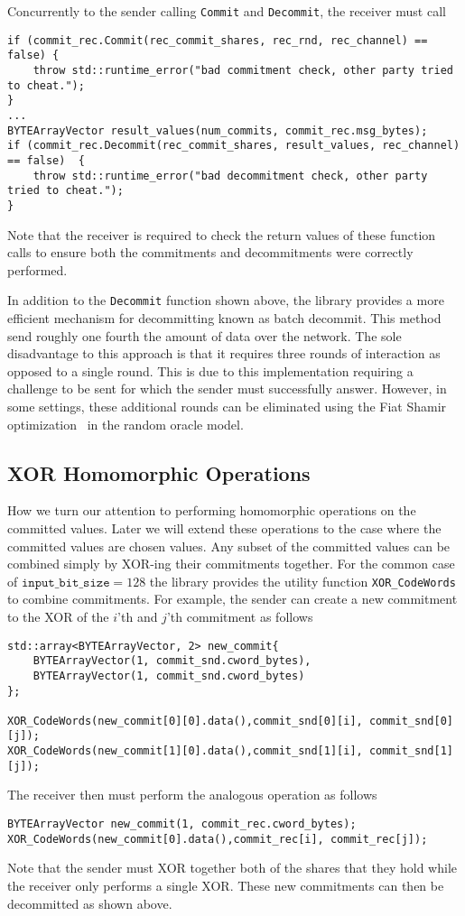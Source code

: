 Concurrently to the sender calling \texttt{Commit} and \texttt{Decommit}, the receiver must call 
\begin{lstlisting}     
if (commit_rec.Commit(rec_commit_shares, rec_rnd, rec_channel) == false) {
	throw std::runtime_error("bad commitment check, other party tried to cheat.");
}
...
BYTEArrayVector result_values(num_commits, commit_rec.msg_bytes);
if (commit_rec.Decommit(rec_commit_shares, result_values, rec_channel) == false)  {
	throw std::runtime_error("bad decommitment check, other party tried to cheat.");
}
\end{lstlisting}
Note that the receiver is required to check the return values of these function calls to ensure both the commitments and decommitments were correctly performed.

In addition to the \texttt{Decommit} function shown above, the library provides a more efficient mechanism for decommitting known as batch decommit. This method send roughly one fourth the amount of data over the network. The sole disadvantage to this approach is that it requires three rounds of interaction as opposed to a single round. This is due to this implementation requiring a challenge to be sent for which the sender must successfully answer. However, in some settings, these additional rounds can be eliminated using the Fiat Shamir optimization~\cite{DBLP:conf/crypto/FiatS86} in the random oracle model.

\subsection{XOR Homomorphic Operations}


How we turn our attention to performing homomorphic operations on the committed values. Later we will extend these operations to the case where the committed values are chosen values. Any subset of the committed values can be combined simply by XOR-ing their commitments together. For the common case of $\texttt{input\_bit\_size} =128$ the library provides the utility function \texttt{XOR\_CodeWords} to combine commitments. For example, the sender can create a new commitment to the XOR of the $i$'th and $j$'th  commitment as follows
\begin{lstlisting}     
std::array<BYTEArrayVector, 2> new_commit{
	BYTEArrayVector(1, commit_snd.cword_bytes),
	BYTEArrayVector(1, commit_snd.cword_bytes)
};

XOR_CodeWords(new_commit[0][0].data(),commit_snd[0][i], commit_snd[0][j]);
XOR_CodeWords(new_commit[1][0].data(),commit_snd[1][i], commit_snd[1][j]);
\end{lstlisting}
The receiver then must perform the analogous operation as follows
\begin{lstlisting}     
BYTEArrayVector new_commit(1, commit_rec.cword_bytes);
XOR_CodeWords(new_commit[0].data(),commit_rec[i], commit_rec[j]);
\end{lstlisting}
Note that the sender must XOR together both of the shares that they hold while the receiver only performs a single XOR. These new commitments can then be decommitted as shown above.

